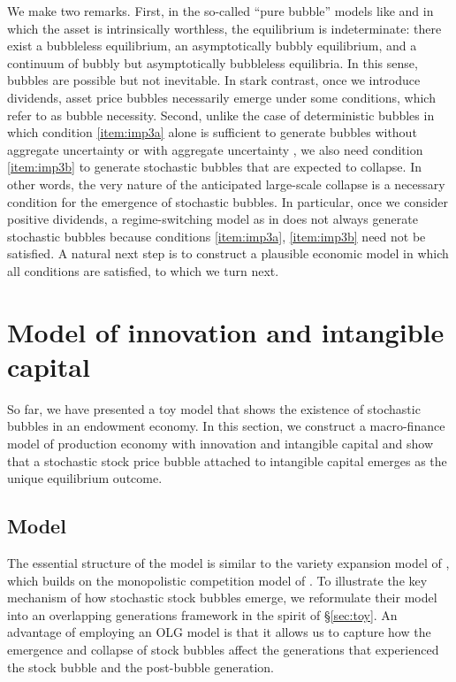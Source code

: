 \documentclass[a4paper,12pt]{article}
\numberwithin{equation}{section}
\theoremstyle{plain}
\begin{document}
We make two remarks. First, in the so-called ``pure bubble'' models like \citet{Samuelson1958} and \citet{Weil1987} in which the asset is intrinsically worthless, the equilibrium is indeterminate: there exist a bubbleless equilibrium, an asymptotically bubbly equilibrium, and a continuum of bubbly but asymptotically bubbleless equilibria. In this sense, bubbles are possible but not inevitable. In stark contrast, once we introduce dividends, asset price bubbles necessarily emerge under some conditions, which \citet{HiranoToda2025JPE} refer to as bubble necessity. Second, unlike the case of deterministic bubbles in which condition \ref{item:imp3a} alone is sufficient to generate bubbles without aggregate uncertainty \citep{HiranoToda2025JPE} or with aggregate uncertainty \citep{HiranoToda2025PNAS}, we also need condition \ref{item:imp3b} to generate stochastic bubbles that are expected to collapse. In other words, the very nature of the anticipated large-scale collapse is a necessary condition for the emergence of stochastic bubbles. In particular, once we consider positive dividends, a regime-switching model as in \citet{Weil1987} does not always generate stochastic bubbles because conditions \ref{item:imp3a}, \ref{item:imp3b} need not be satisfied. A natural next step is to construct a plausible economic model in which all conditions are satisfied, to which we turn next.

\section{Model of innovation and intangible capital} \label{sec:innovation}

So far, we have presented a toy model that shows the existence of stochastic bubbles in an endowment economy. In this section, we construct a macro-finance model of production economy with innovation and intangible capital and show that a stochastic stock price bubble attached to intangible capital emerges as the unique equilibrium outcome.

\subsection{Model}\label{subsec:innovation_model}

The essential structure of the model is similar to the variety expansion model of \citet[Ch.~3]{GrossmanHelpman1991book}, which builds on the monopolistic competition model of \citet{DixitStiglitz1977}. To illustrate the key mechanism of how stochastic stock bubbles emerge, we reformulate their model into an overlapping generations framework in the spirit of \S\ref{sec:toy}. An advantage of employing an OLG model is that it allows us to capture how the emergence and collapse of stock bubbles affect the generations that experienced the stock bubble and the post-bubble generation.
\end{document}
